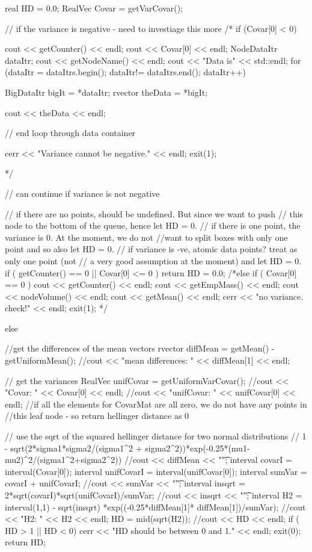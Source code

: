 \begin{DoxyCode}
   {
    real HD = 0.0; 
    RealVec Covar = getVarCovar();

    // if the variance is negative - need to investiage this more
    /*
    if (Covar[0] < 0) {
      cout << getCounter() << endl;
      cout << Covar[0] << endl;
      NodeDataItr dataItr;
      cout << getNodeName() << endl;
      cout << "Data is" << std::endl;
          for (dataItr = dataItrs.begin();
                dataItr!= dataItrs.end(); dataItr++) {

                BigDataItr bigIt = *dataItr;
                rvector theData = *bigIt;

                cout << theData << endl; 
      } // end loop through data container
      
      cerr << "Variance cannot be negative." << endl; 
      exit(1); 
    }
  */
  
    // can continue if variance is not negative

      // if there are no points, should be undefined. But since we want to push
      // this node to the bottom of the queue, hence let HD = 0.
      // if there is one point, the variance is 0. At the moment, we do not 
      //want to split boxes with only one point and so also let HD = 0.
      // if variance is -ve, atomic data points? treat as only one point (not
      // a very good assumption at the moment) and let HD = 0. 
      if ( getCounter() == 0  || Covar[0] <= 0 ) { return HD = 0.0; } 
      /*else if ( Covar[0] == 0 ) { 
        cout << getCounter() << endl;
        cout << getEmpMass() << endl;
        cout << nodeVolume() << endl;
        cout << getMean() << endl;
        cerr << "no variance. check!" << endl;
        exit(1);
      }*/

      else {
        //get the differences of the mean vectors
        rvector diffMean = getMean() - getUniformMean();
        //cout << "mean differences: " << diffMean[1] << endl;
        
        // get the variances
        RealVec unifCovar = getUniformVarCovar();
        //cout << "Covar: " << Covar[0] <<  endl;
        //cout << "unifCovar: " << unifCovar[0] << endl;
        //if all the elements for CovarMat are all zero, we do not have any
       points in 
        //this leaf node - so return hellinger distance as 0
  
        // use the sqrt of the squared hellinger distance for two normal
       distributions
        // 1 - sqrt(2*sigma1*sigma2/(sigma1^2 +
       sigma2^2))*exp(-0.25*(mu1-mu2)^2/(sigma1^2+sigma2^2))
        //cout << diffMean << "\t";
        interval covarI = interval(Covar[0]);
        interval unifCovarI = interval(unifCovar[0]);
        interval sumVar = covarI + unifCovarI;
        //cout << sumVar << "\t";
        interval insqrt = 2*sqrt(covarI)*sqrt(unifCovarI)/sumVar;
        //cout << insqrt << "\t";
        interval H2 = interval(1,1) - sqrt(insqrt) *exp((-0.25*diffMean[1]*
      diffMean[1])/sumVar);
        //cout << "H2: " << H2 << endl;
        HD = mid(sqrt(H2));
        //cout << HD << endl;
        if ( HD > 1 || HD < 0) { 
          cerr << "HD should be between 0 and 1." << endl;
          exit(0);
        }
        return HD;
      }

}
\end{DoxyCode}
